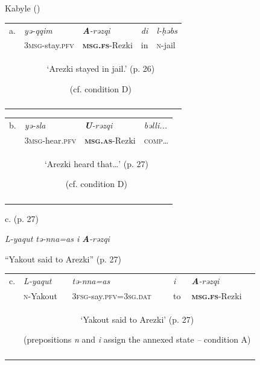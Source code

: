 \documentclass[output=paper]{langscibook}
\begin{document}
\begin{styleStandarduser}
\ea%
    \label{ex:key:7}
    \gll \\
         \\
    \glt
    \z %

          Kabyle (\citealt{SadiLandri2020})
\end{styleStandarduser}


\begin{tabularx}{\textwidth}{XXXXX}

\lsptoprule
a. & \textit{yə-qqim} & \textbf{\textit{A}}\textit{{}-rəzqi} & \textit{di} & \textit{l-ḥəbs}\\
& \textsc{3msg}{}-stay.\textsc{pfv} & \textbf{\textsc{msg.fs}}{}-Rezki & in & \textsc{n}{}-jail\\
& \multicolumn{4}{c}{‘Arezki stayed in jail.’ (p. 26)

(cf. condition D)}\\
\lspbottomrule
\end{tabularx}

\begin{tabularx}{\textwidth}{XXXX}

\lsptoprule
b. & \textit{yə-sla} & \textbf{\textit{U}}\textit{{}-rəzqi} & \textit{bəlli...}\\
& \textsc{3msg}{}-hear.\textsc{pfv} & \textbf{\textsc{msg.as}}{}-Rezki & \textsc{comp}…\\
& \multicolumn{3}{c}{‘Arezki heard that…’ (p. 27)

(cf. condition D)}\\
\lspbottomrule
\end{tabularx}
\begin{styleStandarduser}
c.  (p. 27)
\end{styleStandarduser}

\begin{styleStandarduser}
  \textit{L-yaqut  tə-nna=as  i} \textbf{\textit{A}}\textit{{}-rəzqi}
\end{styleStandarduser}

\begin{styleStandarduser}
  “Yakout said to Arezki” (p. 27)
\end{styleStandarduser}


\begin{tabularx}{\textwidth}{XXXXX}

\lsptoprule
c. & \textit{L-yaqut} & \textit{tə-nna=as} & \textit{i} & \textbf{\textit{A}}\textit{{}-rəzqi}\\
& \textsc{n}{}-Yakout & \textsc{3fsg}{}-say.\textsc{pfv=3sg.dat} & to & \textbf{\textsc{msg.fs}}{}-Rezki\\
& \multicolumn{4}{c}{‘Yakout said to Arezki’ (p. 27)

(prepositions \textit{n} and \textit{i} assign the annexed state \textit{–} condition A)}\\
\lspbottomrule
\end{tabularx}
\end{document}
